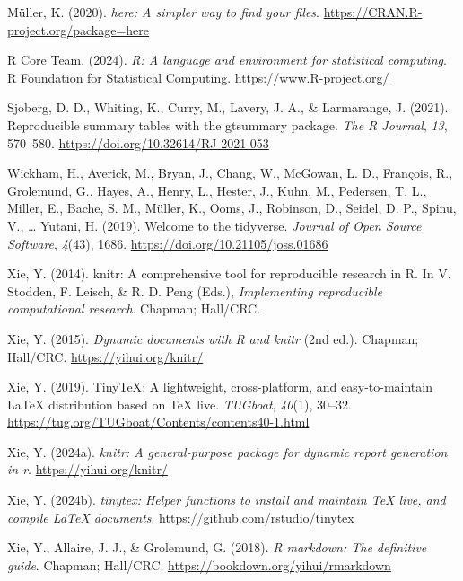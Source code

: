\documentclass[
  letterpaper,
  DIV=11,
  numbers=noendperiod]{scrartcl}
\newlength{\cslhangindent}
\newenvironment{CSLReferences}[2] %
 {\begin{list}{}{%
  \setlength{\itemindent}{0pt}
  \setlength{\leftmargin}{0pt}
  \setlength{\parsep}{0pt}
  \ifodd #1
   \setlength{\leftmargin}{\cslhangindent}
   \setlength{\itemindent}{-1\cslhangindent}
  \fi
  \setlength{\itemsep}{#2\baselineskip}}}
 {\end{list}}
\begin{document}
\begin{CSLReferences}{1}{0}
Müller, K. (2020). \emph{{here}: A simpler way to find your files}.
\url{https://CRAN.R-project.org/package=here}

R Core Team. (2024). \emph{{R}: A language and environment for
statistical computing}. R Foundation for Statistical Computing.
\url{https://www.R-project.org/}

Sjoberg, D. D., Whiting, K., Curry, M., Lavery, J. A., \& Larmarange, J.
(2021). Reproducible summary tables with the gtsummary package.
\emph{{The R Journal}}, \emph{13}, 570--580.
\url{https://doi.org/10.32614/RJ-2021-053}

Wickham, H., Averick, M., Bryan, J., Chang, W., McGowan, L. D.,
François, R., Grolemund, G., Hayes, A., Henry, L., Hester, J., Kuhn, M.,
Pedersen, T. L., Miller, E., Bache, S. M., Müller, K., Ooms, J.,
Robinson, D., Seidel, D. P., Spinu, V., \ldots{} Yutani, H. (2019).
Welcome to the {tidyverse}. \emph{Journal of Open Source Software},
\emph{4}(43), 1686. \url{https://doi.org/10.21105/joss.01686}

Xie, Y. (2014). {knitr}: A comprehensive tool for reproducible research
in {R}. In V. Stodden, F. Leisch, \& R. D. Peng (Eds.),
\emph{Implementing reproducible computational research}. Chapman;
Hall/CRC.

Xie, Y. (2015). \emph{Dynamic documents with {R} and knitr} (2nd ed.).
Chapman; Hall/CRC. \url{https://yihui.org/knitr/}

Xie, Y. (2019). {TinyTeX}: A lightweight, cross-platform, and
easy-to-maintain LaTeX distribution based on TeX live. \emph{TUGboat},
\emph{40}(1), 30--32.
\url{https://tug.org/TUGboat/Contents/contents40-1.html}

Xie, Y. (2024a). \emph{{knitr}: A general-purpose package for dynamic
report generation in r}. \url{https://yihui.org/knitr/}

Xie, Y. (2024b). \emph{{tinytex}: Helper functions to install and
maintain TeX live, and compile LaTeX documents}.
\url{https://github.com/rstudio/tinytex}

Xie, Y., Allaire, J. J., \& Grolemund, G. (2018). \emph{R markdown: The
definitive guide}. Chapman; Hall/CRC.
\url{https://bookdown.org/yihui/rmarkdown}


\end{CSLReferences}
\end{document}
